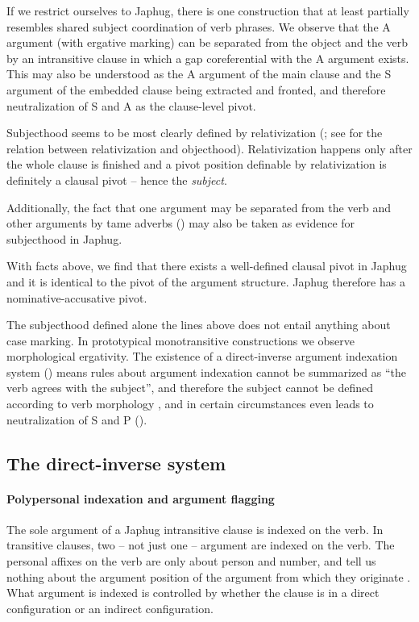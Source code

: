 \documentclass[a4paper, oneside, 12pt]{report}
\newcommand*{\citepage}[1]{p.~{#1}}
\newcommand*{\term}[1]{\emph{#1}}
\begin{document}
If we restrict ourselves to Japhug,
there is one construction that at least partially resembles
shared subject coordination of verb phrases.
We observe that the A argument (with ergative marking) 
can be separated from the object and the verb 
by an intransitive clause \citep[\citepage{306}]{jacques2021grammar}
in which a gap coreferential with the A argument exists.
This may also be understood 
as the A argument of the main clause and the S argument of the embedded clause
being extracted and fronted,
and therefore neutralization of S and A as the clause-level pivot.

Subjecthood seems to be most clearly defined by relativization
(\citealt{jacques2016subjects};
see  for the relation 
between relativization and objecthood).
Relativization happens only after the whole clause is finished
and a pivot position definable by relativization is definitely a clausal pivot
-- hence the \term{subject}.

Additionally, the fact that one argument may be separated from
the verb and other arguments by \ac{tame} adverbs
()
may also be taken as evidence for subjecthood in Japhug.

With facts above, we find that there exists a well-defined clausal pivot in Japhug
and it is identical to the pivot of the argument structure.
Japhug therefore has a nominative-accusative pivot.

The subjecthood defined alone the lines above does not entail
anything about case marking.
In prototypical monotransitive constructions
we observe morphological ergativity.
The existence of a direct-inverse argument indexation system ()
means rules about argument indexation cannot be summarized as 
``the verb agrees with the subject'',
and therefore the subject cannot be defined according to verb morphology \citep{jacques2016subjects},
and in certain circumstances even leads to neutralization of S and P
().

\subsection{The direct-inverse system}\label{sec:grammatical.clause.direct-inverse}

\paragraph*{Polypersonal indexation and argument flagging}
The sole argument of a Japhug intransitive clause is indexed on the verb.
In transitive clauses, 
two -- not just one -- argument are indexed on the verb. 
The personal affixes on the verb are only about person and number, 
and tell us nothing about the argument position of the argument 
from which they originate \citep[\citepage{543}]{jacques2021grammar}.
What argument is indexed is controlled by whether the clause is in a direct configuration
or an indirect configuration.
\end{document}
